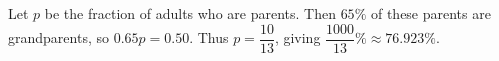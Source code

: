 Let $p$ be the fraction of adults who are parents. Then $65\%$ of these parents are grandparents, so $0.65p=0.50$. Thus $p=\dfrac{10}{13}$, giving $\boxed{\dfrac{1000}{13}\%\approx76.923\%}$.
